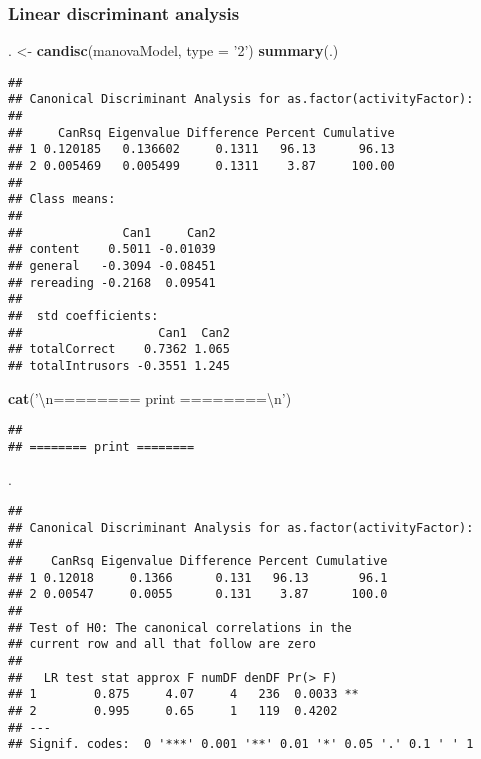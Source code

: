 \documentclass[12pt,]{article}
\newenvironment{Shaded}{\begin{snugshade}}{\end{snugshade}}
\newcommand{\CharTok}[1]{\textcolor[rgb]{0.31,0.60,0.02}{#1}}
\newcommand{\DataTypeTok}[1]{\textcolor[rgb]{0.13,0.29,0.53}{#1}}
\newcommand{\KeywordTok}[1]{\textcolor[rgb]{0.13,0.29,0.53}{\textbf{#1}}}
\newcommand{\NormalTok}[1]{#1}
\newcommand{\StringTok}[1]{\textcolor[rgb]{0.31,0.60,0.02}{#1}}
\begin{document}
\hypertarget{linear-discriminant-analysis}{%
\subsubsection{Linear discriminant
analysis}\label{linear-discriminant-analysis}}

\begin{Shaded}
\begin{Highlighting}[]
\NormalTok{. <-}\StringTok{ }\KeywordTok{candisc}\NormalTok{(manovaModel, }\DataTypeTok{type =} \StringTok{'2'}\NormalTok{)}
\KeywordTok{summary}\NormalTok{(.)}
\end{Highlighting}
\end{Shaded}

\begin{verbatim}
## 
## Canonical Discriminant Analysis for as.factor(activityFactor):
## 
##     CanRsq Eigenvalue Difference Percent Cumulative
## 1 0.120185   0.136602     0.1311   96.13      96.13
## 2 0.005469   0.005499     0.1311    3.87     100.00
## 
## Class means:
## 
##              Can1     Can2
## content    0.5011 -0.01039
## general   -0.3094 -0.08451
## rereading -0.2168  0.09541
## 
##  std coefficients:
##                   Can1  Can2
## totalCorrect    0.7362 1.065
## totalIntrusors -0.3551 1.245
\end{verbatim}

\begin{Shaded}
\begin{Highlighting}[]
\KeywordTok{cat}\NormalTok{(}\StringTok{'}\CharTok{\textbackslash{}n}\StringTok{======== print ========}\CharTok{\textbackslash{}n}\StringTok{'}\NormalTok{)}
\end{Highlighting}
\end{Shaded}

\begin{verbatim}
## 
## ======== print ========
\end{verbatim}

\begin{Shaded}
\begin{Highlighting}[]
\NormalTok{.}
\end{Highlighting}
\end{Shaded}

\begin{verbatim}
## 
## Canonical Discriminant Analysis for as.factor(activityFactor):
## 
##    CanRsq Eigenvalue Difference Percent Cumulative
## 1 0.12018     0.1366      0.131   96.13       96.1
## 2 0.00547     0.0055      0.131    3.87      100.0
## 
## Test of H0: The canonical correlations in the 
## current row and all that follow are zero
## 
##   LR test stat approx F numDF denDF Pr(> F)   
## 1        0.875     4.07     4   236  0.0033 **
## 2        0.995     0.65     1   119  0.4202   
## ---
## Signif. codes:  0 '***' 0.001 '**' 0.01 '*' 0.05 '.' 0.1 ' ' 1
\end{verbatim}
\end{document}
